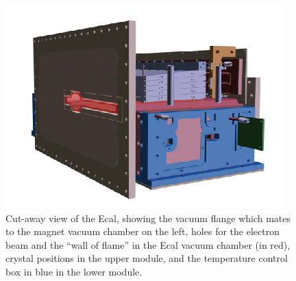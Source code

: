 \begin{figure}[t]
\includegraphics[scale=0.7]{ecal/ECal.png}
\caption{\small{Cut-away view of the Ecal, showing the vacuum flange which mates to the magnet vacuum chamber on the left, holes for the electron beam and the “wall of flame” in the Ecal vacuum chamber (in red), crystal positions in the upper module, and the temperature control box in blue in the lower module.}}\label{fig:ecal}
\end{figure}

